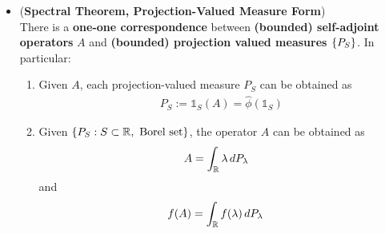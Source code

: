 \documentclass[11pt]{article}
\begin{document}
\begin{itemize}
\item \begin{theorem}(\textbf{Spectral Theorem, Projection-Valued Measure Form}) \citep{reed1980methods}\\
There is a \textbf{one-one correspondence} between \textbf{(bounded) self-adjoint operators} $A$ and \textbf{(bounded) projection valued measures $\left\{P_{S}\right\}$}. In particular:  
\begin{enumerate}
\item Given $A$, each projection-valued measure $P_{S}$ can be obtained as
\begin{align*}
P_{S} := \mathds{1}_{S}(A) = \widehat{\phi}( \mathds{1}_{S})
\end{align*} 

\item Given $\left\{P_{S}: S \subset {\mathbb R}, \text{ Borel set}\right\}$, the operator $A$ can be obtained as
\begin{align}
A &= \int_{{\mathbb R}} \lambda\, dP_{\lambda} \label{eqn: spectral_theorem_spectral_projection_integration}
\end{align} and
\begin{align}
f(A) &=  \int_{{\mathbb R}} f(\lambda)\, dP_{\lambda}  \label{eqn: spectral_theorem_spectral_projection_integration_function_form}
\end{align}
\end{enumerate}
\end{theorem}


\end{itemize}
\end{document}
